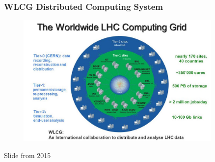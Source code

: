 \begin{frame}
\frametitle{WLCG Distributed Computing System}

\begin{figure}[htbp]
\begin{center}
\includegraphics[width=0.9\textwidth]{images/wlcg-2015.jpeg}
\end{center}
\end{figure}

\small{Slide from 2015}

\end{frame}


